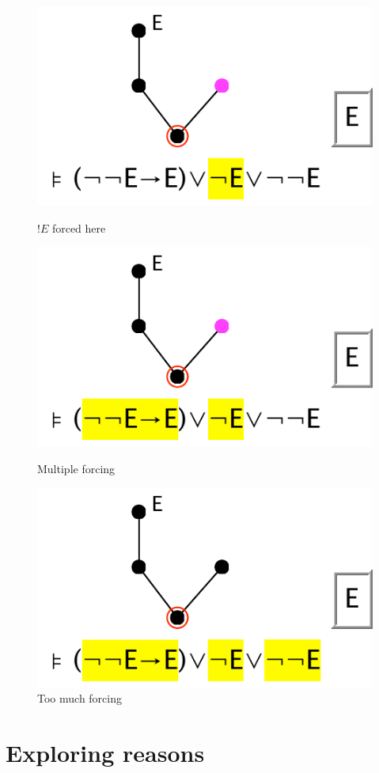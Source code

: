 \documentclass[11pt]{book}
\begin{document}
\begin{figure}
{\includegraphics[scale=0.5]{pics/samuels3}
\caption{$!E$ forced here}
\label{fig:samuels3}
}
\parbox{150pt}{\centering
\includegraphics[scale=0.5]{pics/samuels4}
\caption{Multiple forcing}
\label{fig:samuels4}
}
\qquad
\parbox{150pt}{\centering
\includegraphics[scale=0.5]{pics/samuels5}
\caption{Too much forcing}
\label{fig:samuels5}
}
\end{figure}

\section{Exploring reasons}
\end{document}
